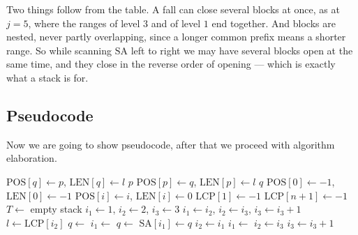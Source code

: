 Two things follow from the table. A fall can close several blocks at once, as at \(j = 5\), where the ranges of level \(3\) and of level \(1\) end together. And blocks are nested, never partly overlapping, since a longer common prefix means a shorter range. So while scanning \(\mathrm{SA}\) left to right we may have several blocks open at the same time, and they close in the reverse order of opening --- which is exactly what a stack is for.

\subsection{Pseudocode}

Now we are going to show pseudocode, after that we proceed with algorithm elaboration.
\begin{algorithm}[H]
\caption{\emph{CPS1a}: computing $\mathrm{POS}$ and $\mathrm{LEN}$ and factorization computation}
\label{alg:cps-scan}
\begin{algorithmic}[1]
        \State $\mathrm{POS}[q] \gets p$, \quad $\mathrm{LEN}[q] \gets l$
        \State \Return $p$
    \Else
        \State $\mathrm{POS}[p] \gets q$, \quad $\mathrm{LEN}[p] \gets l$
        \State \Return $q$
    \EndIf
\EndFunction
\Statex
{}
    \State $\mathrm{POS[0]} \gets -1$, \quad $\mathrm{LEN[0]} \gets -1$
        \State $\mathrm{POS}[i] \gets i$, \quad $\mathrm{LEN}[i] \gets 0$
    \EndFor
        \State \Return
    \EndIf
    \State $\mathrm{LCP}[1] \gets -1$
    \State $\mathrm{LCP}[n+1] \gets -1$
    \State $T \gets$ empty stack
    \State $i_1 \gets 1$, \quad $i_2 \gets 2$, \quad $i_3 \gets 3$
            \State {}
            \State $i_1 \gets i_2$, \quad $i_2 \gets i_3$, \quad $i_3 \gets i_3 + 1$
        \EndWhile
        \State $l \gets \mathrm{LCP}[i_2]$
        \State $q \gets {}$
            \State $i_1 \gets {}$
            \State $q \gets {}$
        \EndWhile
        \State $\mathrm{SA}[i_1] \gets q$
            \State $i_2 \gets i_1$
            \State $i_1 \gets {}$
        \Else
            \State $i_2 \gets i_3$
            \State $i_3 \gets i_3 + 1$
        \EndIf
    \EndWhile
\EndProcedure


\end{algorithmic}
\end{algorithm}

